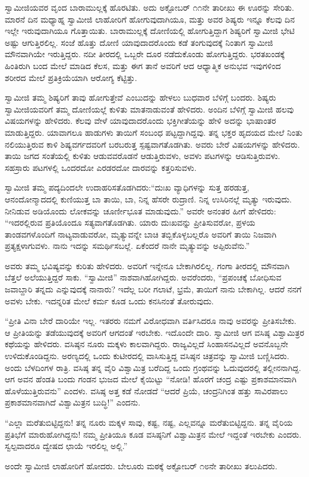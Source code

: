  ಸ್ವಾಮೀಜಿಯವರ ವೃಂದ ಬಾರಾಮುಲ್ಲಕ್ಕೆ ಹೊರಟಿತು. ಅದು ಅಕ್ಟೋಬರ್ ೧೧ನೇ ತಾರೀಖು ಈ ಊರನ್ನು ಸೇರಿತು. ಮಾರನೆ ದಿನ ಮಧ್ಯಾಹ್ನ ಸ್ವಾಮೀಜಿ ಲಾಹೋರಿಗೆ ಹೋಗುವುದಾಗಿಯೂ, ಮತ್ತು ಅವರ ಶಿಷ್ಯರು ಇನ್ನೂ ಕೆಲವು ದಿನ ಇಲ್ಲೇ ಇರುವುದಾಗಿಯೂ ಗೊತ್ತಾಯಿತು. ಬಾರಾಮುಲ್ಲಕ್ಕೆ ದೋಣಿಯಲ್ಲಿ ಹೋಗುತ್ತಿದ್ದಾಗ ಶಿಷ್ಯರಿಗೆ ಸ್ವಾಮೀಜಿ ಭೇಟಿ ಅಷ್ಟು ಆಗುತ್ತಿರಲಿಲ್ಲ. ಸಂಜೆ ಹೊತ್ತು ದೋಣಿ ಯಾವುದಾದರೊಂದು ಕಡೆ ತಂಗುವುದಕ್ಕೆ ನಿಂತಾಗ ಸ್ವಾಮೀಜಿ ಮೌನವಾಗಿಯೇ ಇರುತ್ತಿದ್ದರು. ನದೀ ತೀರದಲ್ಲಿ ಒಬ್ಬರೇ ದೂರ ನಡೆದುಕೊಂಡು ಹೋಗುತ್ತಿದ್ದರು. ಭರತಖಂಡಕ್ಕೆ ಹಿಂತಿರುಗಿ ಬಂದ ಮೇಲೆ ಮಾಡಿದ ಕೆಲಸ, ಮತ್ತು ಈಗ ತಾನೆ ಅವರಿಗೆ ಆದ ಆಧ್ಯಾತ್ಮಿಕ ಅನುಭವ ಇವುಗಳಿಂದ ಶರೀರದ ಮೇಲೆ ಪ್ರತಿಕ್ರಿಯೆಯಾಗಿ ಆರೋಗ್ಯ ಕೆಟ್ಟಿತ್ತು. 

 ಸ್ವಾಮೀಜಿ ತಮ್ಮ ಶಿಷ್ಯರಿಗೆ ತಾವು ಹೋಗುತ್ತೇವೆ ಎಂಬುದನ್ನು ಹೇಳಲು ಬುಧವಾರ ಬೆಳಿಗ್ಗೆ ಬಂದರು. ಶಿಷ್ಯರು ಸ್ವಾಮೀಜಿಯವರಿಗೆ ತಮ್ಮ ದೋಣಿಯಲ್ಲೆ ಕುಳಿತು ಮಾತನಾಡುವಂತೆ ಹೇಳಿದರು. ಅಂದಿನ ಬೆಳಿಗ್ಗೆ ಸ್ವಾಮೀಜಿ ಹಲವು ವಿಷಯಗಳನ್ನು ಹೇಳಿದರು. ಕೆಲವು ವೇಳೆ ಯಾವುದಾದರೊಂದು ಭಕ್ತಿಗೀತೆಯನ್ನು ಹೇಳಿ ಅದನ್ನು ಭಾಷಾಂತರ ಮಾಡುತ್ತಿದ್ದರು. ಯಾವಾಗಲೂ ಹಾಡುಗಳು ತಾಯಿಗೆ ಸಂಬಂಧ ಪಟ್ಟದ್ದಾಗಿದ್ದವು. ತನ್ನ ಭಕ್ತರ ಹೃದಯದ ಮೇಲೆ ನಿಂತು ನಲಿಯುತ್ತಿರುವ ಕಾಳಿ ಶಿಷ್ಯವರ್ಗದವರಿಗೆ ಬರಬರುತ್ತ ಸ್ಪಷ್ಟವಾಗತೊಡಗಿತು. ಅವರು ಬೇರೆ ವಿಷಯಗಳನ್ನು ಹೇಳಿದರು. ತಾಯಿ ಜಗದ ಸಂತೆಯಲ್ಲಿ ಕುಳಿತು ಆಡುವವರೊಡನೆ ಆಡುತ್ತಿರುವಳು, ಅವಳು ಪಟಗಳನ್ನು ಆಡಿಸುತ್ತಿರುವಳು. ಸಹಸ್ರಾರು ಪಟಗಳಲ್ಲಿ ಒಂದರದೋ ಎರಡರದೋ ದಾರವನ್ನು ಕತ್ತರಿಸುವಳು. 

 ಸ್ವಾಮೀಜಿ ತಮ್ಮ ಪದ್ಯದಿಂದಲೇ ಉದಾಹರಿಸತೊಡಗಿದರು:“ದುಃಖ ವ್ಯಾಧಿಗಳನ್ನು ಸುತ್ತ ಹರಡುತ್ತ, ಆನಂದೋನ್ಮಾದದಲ್ಲಿ ಕುಣಿಯುತ್ತ ಬಾ ತಾಯಿ, ಬಾ, ನಿನ್ನ ಹೆಸರೇ ರುದ್ರಾಣಿ. ನಿನ್ನ ಉಸಿರಿನಲ್ಲೆ ಮೃತ್ಯು ಇರುವುದು. ನೀನಿಡುವ ಅಡಿಯೊಂದು ಲೋಕವನ್ನು ಚೂರ್ಣೀಭೂತ ಮಾಡುವುದು.” ಅವರೇ ಅನಂತರ ಹೀಗೆ ಹೇಳಿದರು: “ಇದರಲ್ಲಿರುವ ಪ್ರತಿಯೊಂದೂ ಸತ್ಯವಾಗತೊಡಗಿತು. ಯಾರು ದುಃಖವನ್ನು ಪ್ರೀತಿಸುವರೋ, ಪ್ರಳಯ ತಾಂಡವಗಳೊಂದಿಗೆ ನಾಟ್ಯವಾಡುವರೋ, ಮೃತ್ಯುವನ್ನೇ ಬಾಚಿ ತಬ್ಬಿಕೊಳ್ಳಬಲ್ಲರೊ ಅವರಿಗೆ ತಾಯಿ ನಿಜವಾಗಿ ಪ್ರತ್ಯಕ್ಷಳಾಗುವಳು. ನಾನು ಇದನ್ನು ಸಮರ್ಥಿಸಬಲ್ಲೆ. ಏಕೆಂದರೆ ನಾನೇ ಮೃತ್ಯುವನ್ನು ಅಪ್ಪಿರುವೆನು.” 

 ಅವರು ತಮ್ಮ ಭವಿಷ್ಯವನ್ನು ಕುರಿತು ಹೇಳಿದರು. ಅವರಿಗೆ ಇನ್ನೇನೂ ಬೇಕಾಗಿರಲಿಲ್ಲ. ಗಂಗಾ ತೀರದಲ್ಲಿ ಮೌನವಾಗಿ ಬೆತ್ತಲೆ ಅಲೆಯುತ್ತಿದ್ದರೆ ಸಾಕು. “ಸ್ವಾಮೀಜಿ” ನಾಶವಾಗಿಹೋಗಿದ್ದರು. ಅವರೆಂದರು, “ಪ್ರಪಂಚಕ್ಕೆ ಬೋಧಿಸುವ ಜವಾಬ್ದಾರಿ ತನ್ನದು ಎನ್ನುವುದಕ್ಕೆ ನಾನಾರು? ಇದೆಲ್ಲ ಬರೀ ಗಲಾಟೆ, ಭ್ರಮೆ, ತಾಯಿಗೆ ನಾನು ಬೇಕಾಗಿಲ್ಲ. ಆದರೆ ನನಗೆ ಅವಳು ಬೇಕು. ಇದನ್ನರಿತ ಮೇಲೆ ಕರ್ಮ ಕೂಡ ಒಂದು ಕನಸಿನಂತೆ ತೋರುವುದು.

“ಪ್ರೀತಿ ವಿನಾ ಬೇರೆ ದಾರಿಯೇ ಇಲ್ಲ. ಇತರರು ನಮಗೆ ವಿರೋಧವಾಗಿ ವರ್ತಿಸಿದರೂ ನಾವು ಅವರನ್ನು ಪ್ರೀತಿಸಬೇಕು. ಆ ಪ್ರೀತಿಯನ್ನು ತಡೆಯುವುದಕ್ಕೆ ಅವರಿಗೆ ಆಗದಂತೆ ಇರಬೇಕು. ಇದೊಂದೇ ದಾರಿ. ಸ್ವಾಮೀಜಿ ಆಗ ವಸಿಷ್ಠ ವಿಶ್ವಾಮಿತ್ರರ ಕಥೆಯನ್ನು ಹೇಳಿದರು. ವಸಿಷ್ಠನ ನೂರು ಮಕ್ಕಳು ಕಾಲವಾಗಿದ್ದರು. ರಾಜ್ಯವಿಲ್ಲದೆ ಸಿಂಹಾಸನವಿಲ್ಲದೆ ಅವನೊಬ್ಬನೇ ಉಳಿದುಕೊಂಡಿದ್ದನು. ಅರಣ್ಯದಲ್ಲಿ ಒಂದು ಕುಟೀರದಲ್ಲಿ ವಾಸಿಸುತ್ತಿದ್ದ ವಸಿಷ್ಠನ ಚಿತ್ರವನ್ನು ಸ್ವಾಮೀಜಿ ಬಣ್ಣಿಸಿದರು. ಅಂದು ಬೆಳದಿಂಗಳ ರಾತ್ರಿ. ವಸಿಷ್ಠ ತನ್ನ ವೈರಿ ವಿಶ್ವಾಮಿತ್ರ ಬರೆದಿದ್ದ ಒಂದು ಗ್ರಂಥವನ್ನು ಓದುವುದರಲ್ಲಿ ತಲ್ಲೀನನಾಗಿದ್ದ. ಆಗ ಅವನ ಹೆಂಡತಿ ಬಂದು ಗಂಡನ ಭುಜದ ಮೇಲೆ ಕೈಯಿಟ್ಟು “ನೋಡಿ! ಹೊರಗೆ ಚಂದ್ರ ಎಷ್ಟು ಪ್ರಕಾಶಮಾನವಾಗಿ ಹೊಳೆಯುತ್ತಿರುವನು” ಎಂದಳು. ವಸಿಷ್ಠ ಅತ್ತ ಕಡೆ ನೋಡದೆ “ಆದರೆ ಪ್ರಿಯೆ, ಚಂದ್ರನಿಗಿಂತ ಹತ್ತು ಸಾವಿರಪಾಲು ಪ್ರಕಾಶಮಾನವಾಗಿದೆ ವಿಶ್ವಾಮಿತ್ರನ ಬುದ್ಧಿ!” ಎಂದನು. 

“ಎಲ್ಲಾ ಮರೆತುಬಿಟ್ಟಿದ್ದನು! ತನ್ನ ನೂರು ಮಕ್ಕಳ ಸಾವು, ಕಷ್ಟ, ನಷ್ಟ, ಎಲ್ಲವನ್ನೂ ಮರೆತುಬಿಟ್ಟಿದ್ದನು. ತನ್ನ ವೈರಿಯ ಪ್ರತಿಭೆಗೆ ಮಾರುಹೋಗಿದ್ದನು! ನಮ್ಮ ಪ್ರೀತಿಯೂ ಕೂಡ ವಸಿಷ್ಠನಿಗೆ ವಿಶ್ವಾಮಿತ್ರನ ಮೇಲೆ ಇದ್ದಂತೆ ಇರಬೇಕು ಎಂದರು. ಸ್ವಲ್ಪವಾದರೂ ದ್ವೇಷದ ಛಾಯೆ ಇರಲಿಲ್ಲ ಅಲ್ಲಿ.” 

 ಅಂದೇ ಸ್ವಾಮೀಜಿ ಲಾಹೋರಿಗೆ ಹೋದರು. ಬೇಲೂರು ಮಠಕ್ಕೆ ಅಕ್ಟೋಬರ್ ೧೮ನೇ ತಾರೀಖು ತಲುಪಿದರು. 


